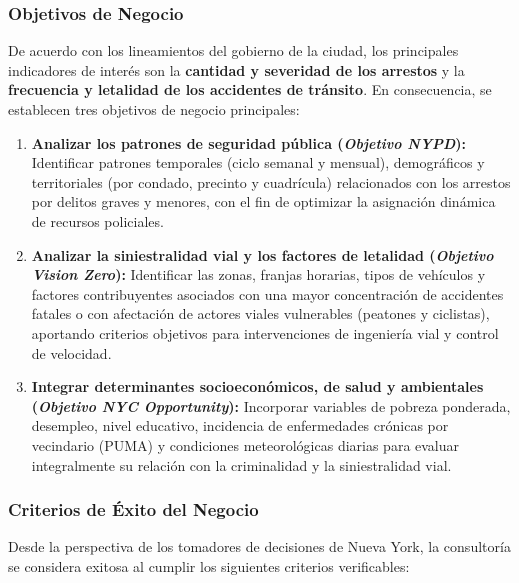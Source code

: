 \documentclass[11pt,a4paper]{article}
\begin{document}
\subsubsection{Objetivos de Negocio}

De acuerdo con los lineamientos del gobierno de la ciudad, los principales indicadores de interés son la \textbf{cantidad y severidad de los arrestos} y la \textbf{frecuencia y letalidad de los accidentes de tránsito}. En consecuencia, se establecen tres objetivos de negocio principales:

\begin{enumerate}
    \item \textbf{Analizar los patrones de seguridad pública (\textit{Objetivo NYPD}):} Identificar patrones temporales (ciclo semanal y mensual), demográficos y territoriales (por condado, precinto y cuadrícula) relacionados con los arrestos por delitos graves y menores, con el fin de optimizar la asignación dinámica de recursos policiales.

    \item \textbf{Analizar la siniestralidad vial y los factores de letalidad (\textit{Objetivo Vision Zero}):} Identificar las zonas, franjas horarias, tipos de vehículos y factores contribuyentes asociados con una mayor concentración de accidentes fatales o con afectación de actores viales vulnerables (peatones y ciclistas), aportando criterios objetivos para intervenciones de ingeniería vial y control de velocidad.

    \item \textbf{Integrar determinantes socioeconómicos, de salud y ambientales (\textit{Objetivo NYC Opportunity}):} Incorporar variables de pobreza ponderada, desempleo, nivel educativo, incidencia de enfermedades crónicas por vecindario (PUMA) y condiciones meteorológicas diarias para evaluar integralmente su relación con la criminalidad y la siniestralidad vial.
\end{enumerate}

\subsubsection{Criterios de Éxito del Negocio}

Desde la perspectiva de los tomadores de decisiones de Nueva York, la consultoría se considera exitosa al cumplir los siguientes criterios verificables:
\end{document}
